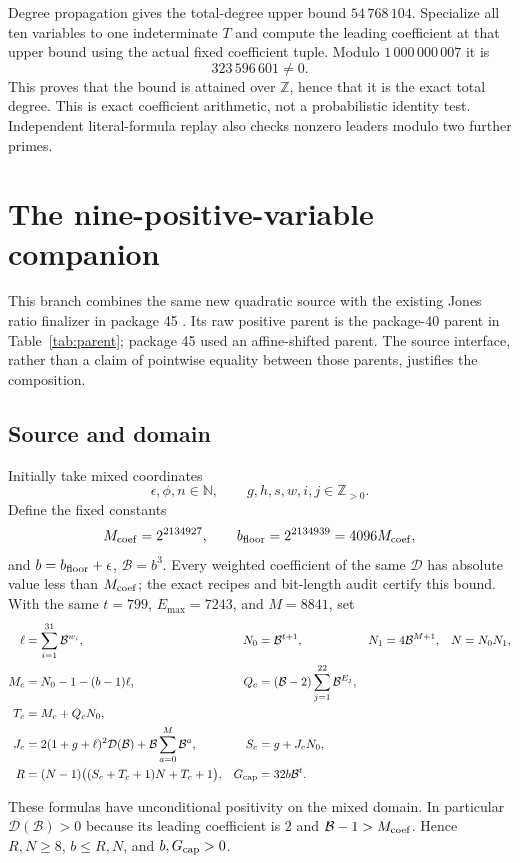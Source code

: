 \documentclass[11pt,letterpaper]{article}
\theoremstyle{remark}\newtheorem{remark}[theorem]{Remark}
\newcommand{\Z}{\mathbb Z}\newcommand{\N}{\mathbb N}
\newcommand{\Pos}{\mathbb Z_{>0}}
\begin{document}
Degree propagation gives the total-degree upper bound
$54\,768\,104$.
Specialize all ten variables to one indeterminate $T$ and compute
the leading coefficient at that upper bound using the actual fixed
coefficient tuple. Modulo $1\,000\,000\,007$ it is
\[
 323\,596\,601\ne0.
\]
This proves that the bound is attained over $\Z$, hence that it is the
exact total degree. This is exact coefficient arithmetic, not a
probabilistic identity test. Independent literal-formula replay also
checks nonzero leaders modulo two further primes.

\section{The nine-positive-variable companion}\label{sec:nine}
This branch combines the same new quadratic source with the existing
Jones ratio finalizer in package 45 \cite{repo45}. Its raw positive
parent is the package-40 parent in Table~\ref{tab:parent}; package 45
used an affine-shifted parent. The source interface, rather than a claim
of pointwise equality between those parents, justifies the composition.

\subsection{Source and domain}
Initially take mixed coordinates
\[
 \epsilon,\phi,n\in\N,\qquad g,h,s,w,i,j\in\Pos.
\]
Define the fixed constants
\[
 M_{\rm coef}=2^{2134927},\qquad b_{\rm floor}=2^{2134939}
 =4096M_{\rm coef},
\]
and $b=b_{\rm floor}+\epsilon$, $\mathcal B=b^3$.
Every weighted coefficient of the same $\mathcal D$ has absolute value
less than $M_{\rm coef}$; the exact recipes and bit-length audit certify
this bound. With the same $t=799$, $E_{\max}=7243$, and $M=8841$, set
\begin{align*}
 \ell&=\sum_{i=1}^{31}\mathcal B^{w_i},&
 N_0&=\mathcal B^{t+1},&
 N_1&=4\mathcal B^{M+1},&
 N&=N_0N_1,\\
 M_c&=N_0-1-(b-1)\ell,&
 Q_c&=(\mathcal B-2)\sum_{j=1}^{22}\mathcal B^{E_j},\\
 T_c&=M_c+Q_cN_0,\\
 J_c&=2(1+g+\ell)^2\mathcal D(\mathcal B)
       +\mathcal B\sum_{a=0}^{M}\mathcal B^a,&
 S_c&=g+J_cN_0,\\
 R&=(N-1)\bigl((S_c+T_c+1)N+T_c+1\bigr),&
 G_{\rm cap}&=32b\mathcal B^t.
\end{align*}

These formulas have unconditional positivity on the mixed domain.
In particular $\mathcal D(\mathcal B)>0$ because its leading coefficient
is $2$ and $\mathcal B-1>M_{\rm coef}$.
Hence $R,N\ge8$, $b\le R,N$, and $b,G_{\rm cap}>0$.
\end{document}
